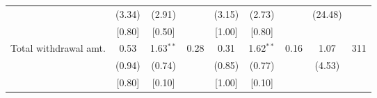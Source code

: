 \begin{table}[h]
{\begin{threeparttable}
\begin{tabular}{l*{8}{c}}
          &   (3.34)&   (2.91)&         &   (3.15)&   (2.73)&         &  (24.48)&         \\
          &   [0.80]&   [0.50]&         &   [1.00]&   [0.80]&         &         &         \\
Total withdrawal amt.&     0.53&1.63$^{**}$&     0.28&     0.31&1.62$^{**}$&     0.16&     1.07&      311\\
          &   (0.94)&   (0.74)&         &   (0.85)&   (0.77)&         &   (4.53)&         \\
          &   [0.80]&   [0.10]&         &   [1.00]&   [0.10]&         &         &         \\
\bottomrule \end{tabular} \begin{tablenotes}[flushleft] \footnotesize \item  \end{tablenotes} \end{threeparttable} } \end{table}
